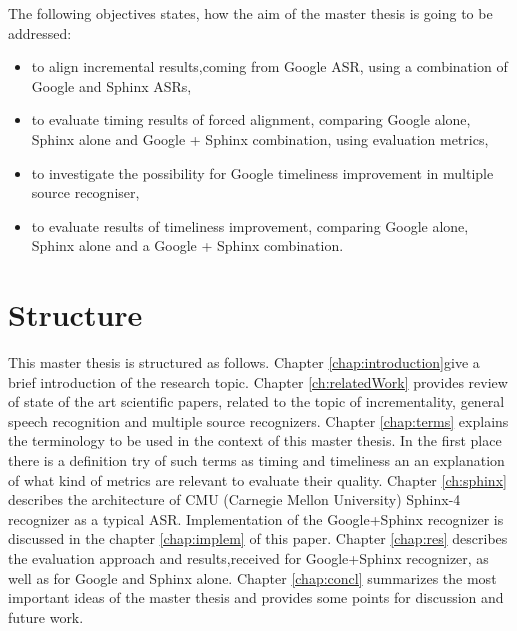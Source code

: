 The following objectives states, how the aim of the master thesis is going to be
addressed:
 \begin  {itemize}
   \item to align incremental results,coming from Google ASR, using a
   combination of Google and Sphinx ASRs,
   \item to evaluate timing results of forced alignment, comparing Google
   alone, Sphinx alone and Google + Sphinx combination, using evaluation
   metrics,
   \item to investigate the possibility for Google timeliness improvement in
   multiple source recogniser,
   \item to evaluate results of timeliness improvement, comparing Google alone,
   Sphinx alone and a Google + Sphinx combination.
 \end {itemize}


\section {Structure}
This master thesis is structured as follows. Chapter \ref{chap:introduction}give
a brief introduction of the research topic. Chapter \ref{ch:relatedWork}
provides review of state of the art scientific papers, related to the topic of
incrementality, general speech recognition and multiple source recognizers.
Chapter \ref{chap:terms} explains the terminology to be used in the context of this master thesis.  
In the first place there is a definition try of such terms as timing and
timeliness an an explanation of what kind of metrics are relevant to
evaluate their quality. Chapter \ref{ch:sphinx} describes the architecture of
CMU (Carnegie Mellon University) Sphinx-4 recognizer as a typical ASR.
Implementation of the Google+Sphinx recognizer is discussed in the chapter
\ref{chap:implem} of this paper. Chapter \ref{chap:res} describes the evaluation approach and results,received for Google+Sphinx recognizer, as
well as for Google and Sphinx alone.
Chapter \ref{chap:concl} summarizes the most important ideas of the master
thesis and provides some points for discussion and future work.
